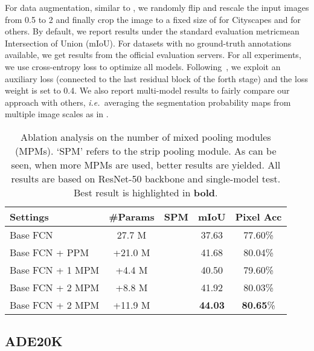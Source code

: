 \documentclass[final]{cvpr}
\def\ie{\emph{i.e.~}}
\newcommand{\cmark}{\ding{51}}\newcommand{\xmark}{\ding{55}}
\begin{document}
For data augmentation, similar to \cite{zhao2016pyramid,zhang2018context},
we randomly flip and rescale the input images from 0.5 to 2 and 
finally crop the image to a fixed size of 
for Cityscapes and  for others.
By default, we report results under the standard evaluation metric\textemdash mean Intersection of Union (mIoU).
For datasets with no ground-truth annotations available, we get results from
the official evaluation servers.
For all experiments, we use cross-entropy loss to optimize all models.
Following~\cite{zhao2016pyramid}, we exploit an auxiliary loss (connected to the last residual block of the forth stage) and the loss weight is set to 0.4.
We also report multi-model results to fairly compare our approach with others,
\ie averaging the segmentation probability maps from multiple image scales
 as 
in \cite{lin2017refinenet,zhao2016pyramid,zhang2018context}.



\begin{table}[t]
  \centering
  \small
  \setlength\tabcolsep{1.7mm}
  \renewcommand\arraystretch{1}
  \begin{tabular}{lcccc} \toprule[0.5pt]
    Settings & \#Params & SPM & mIoU & Pixel Acc \\ \midrule[0.5pt] \midrule[0.5pt]
    Base FCN     & 27.7 M   & \xmark & 37.63 & 77.60\% \\
    Base FCN + PPM \cite{zhao2016pyramid} & +21.0 M & \xmark & 41.68 & 80.04\% \\  \midrule[0.5pt] \midrule[0.5pt]
    Base FCN + 1 MPM & +4.4 M & \xmark & 40.50 & 79.60\% \\
    Base FCN + 2 MPM & +8.8 M & \xmark & 41.92 & 80.03\% \\ 
    Base FCN + 2 MPM & +11.9 M & \cmark & \textbf{44.03} & \textbf{80.65}\% \\ \bottomrule[0.5pt]
  \end{tabular}
  \vspace{0pt}
  \caption{Ablation analysis on the number of mixed pooling modules (MPMs). `SPM' refers to the strip pooling module.
  As can be seen, when more MPMs are used, 
  better results are yielded. All results are based on ResNet-50 backbone and single-model test.
  Best result is highlighted in \textbf{bold}.}
  \label{tab:num_modules}
\end{table}


\subsection{ADE20K}
\end{document}
